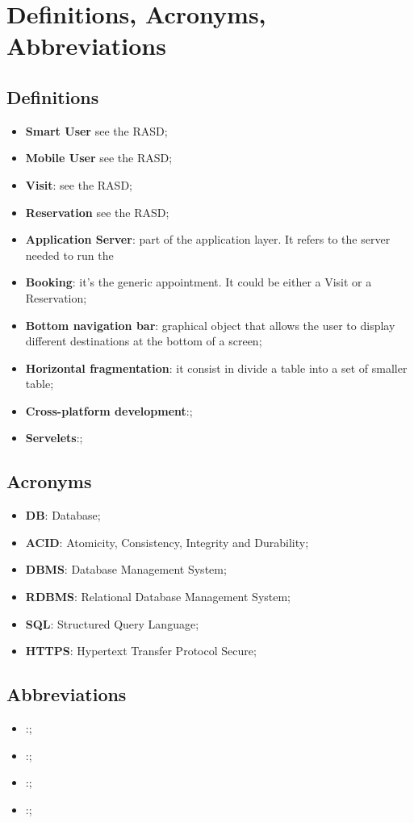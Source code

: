 \section{Definitions, Acronyms, Abbreviations}
\subsection{Definitions}
\begin{itemize}
\item \textbf{Smart User} see the RASD;
\item \textbf{Mobile User} see the RASD;
\item \textbf{Visit}: see the RASD; 
\item \textbf{Reservation} see the RASD;
\item \textbf{Application Server}: part of the application layer. It refers to the server needed to run the 
\item \textbf{Booking}: it's the generic appointment. It could be either a Visit or a Reservation;
\item \textbf{Bottom navigation bar}: graphical object that allows the user to display different destinations at the bottom of a screen;
\item \textbf{Horizontal fragmentation}: it consist in divide a table into a set of smaller table;
\item \textbf{Cross-platform development}:;
\item \textbf{Servelets}:;

\end{itemize}
\subsection{Acronyms}
\begin{itemize}

\item \textbf{DB}: Database;
\item \textbf{ACID}: Atomicity, Consistency, Integrity and Durability;
\item \textbf{DBMS}: Database Management System;
\item \textbf{RDBMS}: Relational Database Management System;
\item \textbf{SQL}: Structured Query Language;
\item \textbf{HTTPS}: Hypertext Transfer Protocol Secure;


\end{itemize}
\subsection{Abbreviations}
\begin{itemize}
\item \textbf{}:;
\item \textbf{}:;
\item \textbf{}:;
\item \textbf{}:;


\end{itemize}


